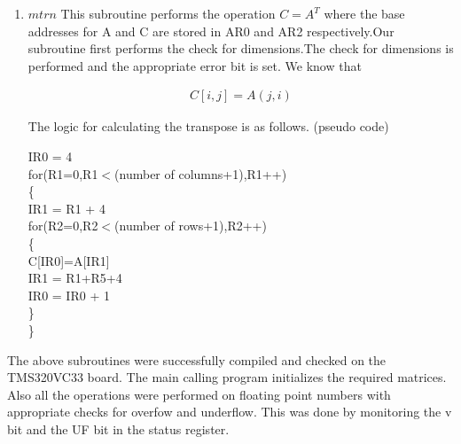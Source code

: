\documentclass[a4paper,12pt]{article}
\begin{document}
\begin{enumerate}
\begin{flushleft}
\begin{enumerate}
\begin{flushleft}
    \end{flushleft}
    \item
    \begin{flushleft}
     $mtrn $ This subroutine performs the operation $C = A^T$ where the base addresses for A and C are stored in AR0
     and AR2 respectively.Our subroutine first performs the check for dimensions.The check for dimensions is performed
     and the appropriate error bit is set.
     We know that 
    \end{flushleft}
    \begin{align}
     C[i,j] = A(j,i) \nonumber
    \end{align}
    \begin{flushleft}
    The logic for calculating the transpose is as follows. (pseudo code)
    \end{flushleft}
    \begin{flushleft}
     IR0 = 4 \nonumber \\
     for(R1=0,R1$<$(number of columns+1),R1++) \\
     \{\\
      IR1 = R1 + 4 \\
      for(R2=0,R2$<$(number of rows+1),R2++) \\
      \{\\
      C[IR0]=A[IR1] \\
      IR1 = R1+R5+4 \\
      IR0 = IR0 + 1 \\
       \}\\
       \}\\
    \end{flushleft}
    

   \end{enumerate}
    
    \begin{flushleft}
     The above subroutines were successfully compiled and checked on the TMS320VC33 board. The main calling program initializes
     the required matrices. Also all the operations were performed on floating point numbers with appropriate checks for overfow
     and underflow. This was done by monitoring the v bit and the UF bit in the status register. 
    \end{flushleft}


 \end{flushleft}
 \end{enumerate}
\end{document}
